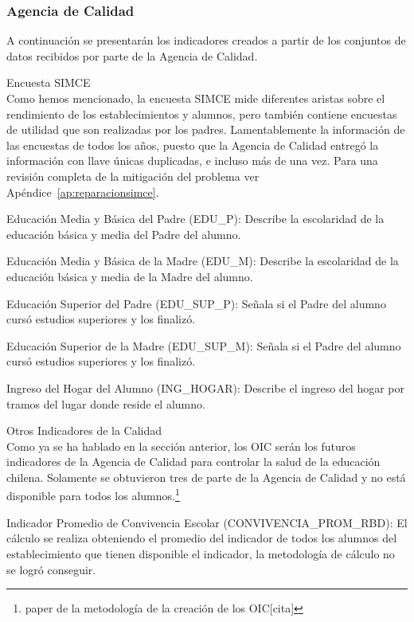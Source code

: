 \subsubsection{Agencia de Calidad}
A continuación se presentarán los indicadores creados a partir de los conjuntos de datos recibidos por parte de la Agencia de Calidad.
\begin{longdescription}
  \item[Encuesta SIMCE] \hfill \\
    Como hemos mencionado, la encuesta SIMCE mide diferentes aristas sobre el rendimiento de los establecimientos y alumnos, pero también contiene encuestas de utilidad que son realizadas por los padres. Lamentablemente la información de las encuestas de todos los años, puesto que la Agencia de Calidad entregó la información con llave únicas duplicadas, e incluso más de una vez. Para una revisión completa de la mitigación del problema ver Apéndice~\ref{ap:reparacionsimce}.
     \begin{longdescription}
        \item[Educación Media y Básica del Padre](EDU\_P): Describe la escolaridad de la educación básica y media del Padre del alumno.
        \item[Educación Media y Básica de la Madre](EDU\_M): Describe la escolaridad de la educación básica y media de la Madre del alumno.
        \item[Educación Superior del Padre](EDU\_SUP\_P): Señala si el Padre del alumno cursó estudios superiores y los finalizó.
        \item[Educación Superior de la Madre](EDU\_SUP\_M): Señala si el Padre del alumno cursó estudios superiores y los finalizó.
        \item[Ingreso del Hogar del Alumno](ING\_HOGAR): Describe el ingreso del hogar por tramos del lugar donde reside el alumno.
     \end{longdescription}
  \item[Otros Indicadores de la Calidad] \hfill \\
    Como ya se ha hablado en la sección anterior, los OIC serán los futuros indicadores de la Agencia de Calidad para controlar la salud de la educación chilena. Solamente se obtuvieron tres de parte de la Agencia de Calidad y no está disponible para todos los alumnos.\footnote{paper de la metodología de la creación de los OIC[cita]}
       \begin{longdescription}
        \item[Indicador Promedio de Convivencia Escolar](CONVIVENCIA\_PROM\_RBD): El cálculo se realiza obteniendo el promedio del indicador de todos los alumnos del establecimiento que tienen disponible el indicador, la metodología de cálculo no se logró conseguir.

\end{longdescription}
\end{longdescription}
